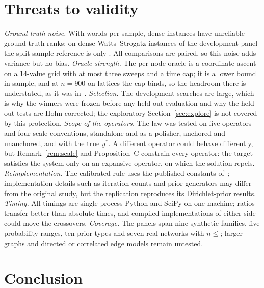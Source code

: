 \documentclass[11pt,a4paper]{article}
\theoremstyle{definition}
\theoremstyle{plain}
\begin{document}
\section{Threats to validity}\label{sec:limitations}

\emph{Ground-truth noise.} With \MGT{} worlds per sample, dense instances have unreliable ground-truth ranks; on dense Watts--Strogatz instances of the development panel the split-sample reference is only \WSDenseCeiling. All comparisons are paired, so this noise adds variance but no bias. \emph{Oracle strength.} The per-node oracle is a coordinate ascent on a 14-value grid with at most three sweeps and a time cap; it is a lower bound in sample, and at $n=900$ on lattices the cap binds, so the headroom there is understated, as it was in~\cite{konstantellos26}. \emph{Selection.} The development searches are large, which is why the winners were frozen before any held-out evaluation and why the held-out tests are Holm-corrected; the exploratory Section~\ref{sec:explore} is not covered by this protection. \emph{Scope of the operators.} The law was tested on five operators and four scale conventions, standalone and as a polisher, anchored and unanchored, and with the true $y^*$. A different operator could behave differently, but Remark~\ref{rem:scale} and Proposition~C constrain every operator: the target satisfies the system only on an expansive operator, on which the solution repels. \emph{Reimplementation.} The calibrated rule uses the published constants of~\cite{konstantellos26}; implementation details such as iteration counts and prior generators may differ from the original study, but the replication reproduces its Dirichlet-prior results. \emph{Timing.} All timings are single-process Python and SciPy on one machine; ratios transfer better than absolute times, and compiled implementations of either side could move the crossovers. \emph{Coverage.} The panels span nine synthetic families, five probability ranges, ten prior types and seven real networks with $n\le{}$\SweepNmax{}; larger graphs and directed or correlated edge models remain untested.

\section{Conclusion}\label{sec:conclusion}
\end{document}
